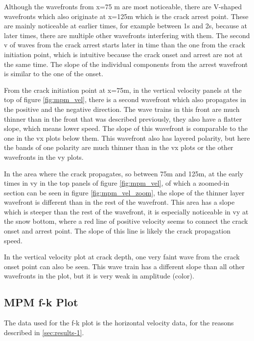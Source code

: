 Although the wavefronts from x=75 m are most noticeable, there are V-shaped wavefronts which also originate at x=125m which is the crack arrest point. These are mainly noticeable at earlier times, for example between 1s and 2s, because at later times, there are multiple other wavefronts interfering with them. The second v of waves from the crack arrest starts later in time than the one from the crack initiation point, which is intuitive because the crack onset and arrest are not at the same time. The slope of the individual components from the arrest wavefront is similar to the one of the onset. \par

From the crack initiation point at x=75m, in the vertical velocity panels at the top of figure \ref{fig:mpm_vel}, there is a second wavefront which also propagates in the positive and the negative direction. The wave trains in this front are much thinner than in the front that was described previously, they also have a flatter slope, which means lower speed. The slope of this wavefront is comparable to the one in the vx plots below them. This wavefront also has layered polarity, but here the bands of one polarity are much thinner than in the vx plots or the other wavefronts in the vy plots. \par

In the area where the crack propagates, so between 75m and 125m, at the early times in vy in the top panels of figure \ref{fig:mpm_vel}, of which a zoomed-in section can be seen in figure \ref{fig:mpm_vel_zoom}, the slope of the thinner layer wavefront is different than in the rest of the wavefront. This area has a slope which is steeper than the rest of the wavefront, it is especially noticeable in vy at the snow bottom, where a red line of positive velocity seems to connect the crack onset and arrest point. The slope of this line is likely the crack propagation speed. \par

In the vertical velocity plot at crack depth, one very faint wave from the crack onset point can also be seen. This wave train has a different slope than all other wavefronts in the plot, but it is very weak in amplitude (color). \par 


\subsection{MPM f-k Plot}

The data used for the f-k plot is the horizontal velocity data, for the reasons described in \ref{sec:results-1}. 

